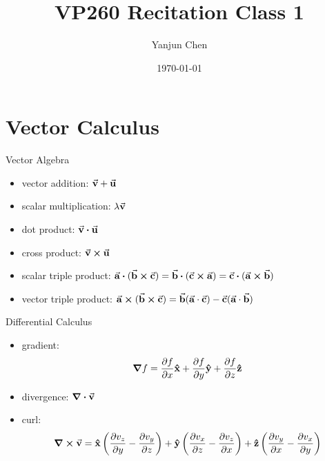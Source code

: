 \documentclass{beamer}
\title[VP260 RC]{VP260 Recitation Class 1} %
\author{Yanjun Chen} %
\institute[UM-SJTU JI] %
{
    University of Michigan - Shanghai Jiao Tong University Joint Institute\\%
\medskip
}
\date{\today} %
\begin{document}
\begin{frame}
    \titlepage %
\end{frame}





\section{Vector Calculus} %


\begin{frame}{Vector Algebra}	
	\begin{itemize}
		\item vector addition: $\va{v} + \va{u} $
		\item scalar multiplication: $\lambda \va{v}$
		\item dot product: $\va{v} \vdot \va{u}$
		\item cross product: $\va{v} \cp \va{u}$
		\item scalar triple product: $\va{a} \vdot (\va{b} \cp \va{c}) =\va{b} \vdot (\va{c} \cp \va{a}) = \va{c} \vdot (\va{a} \cp \va{b})$
		\item vector triple product: $\va{a} \cp (\va{b} \cp \va{c}) = \va{b} (\va{a} \cdot \va{c}) - \va{c} (\va{a} \cdot \va{b})$
	\end{itemize}
\end{frame}

\begin{frame}{Differential Calculus}
	\begin{itemize}
		\item gradient: $$\grad f = \pdv{f}{x} \vu{x} + \pdv{f}{y} \vu{y} + \pdv{f}{z} \vu{z}$$
		\item divergence: $\div{\va{v}}$
		\item curl: $$\curl{\va{v}} = \vu{x} \left(\pdv{v_z}{y} - \pdv{v_y}{z}\right) + \vu{y} \left( \pdv{v_x}{z} - \pdv{v_z}{x}\right) + \vu{z} \left( \pdv{v_y}{x} - \pdv{v_x}{y}\right)$$
	\end{itemize}	
\end{frame}
\end{document}
